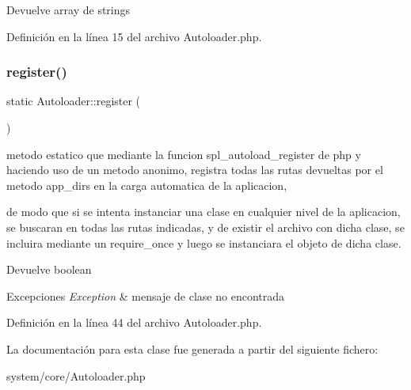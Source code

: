 \begin{DoxyReturn}{Devuelve}
array de strings 
\end{DoxyReturn}


Definición en la línea 15 del archivo Autoloader.\+php.

\mbox{\label{class_autoloader_a818817cb215d74d3c65e4855898b8902}} 
\subsubsection{\texorpdfstring{register()}{register()}}
{\footnotesize\ttfamily static Autoloader\+::register (\begin{DoxyParamCaption}{ }\end{DoxyParamCaption})\hspace{0.3cm}{\ttfamily [static]}}

metodo estatico que mediante la funcion spl\+\_\+autoload\+\_\+register de php y haciendo uso de un metodo anonimo, registra todas las rutas devueltas por el metodo app\+\_\+dirs en la carga automatica de la aplicacion,

de modo que si se intenta instanciar una clase en cualquier nivel de la aplicacion, se buscaran en todas las rutas indicadas, y de existir el archivo con dicha clase, se incluira mediante un require\+\_\+once y luego se instanciara el objeto de dicha clase.

\begin{DoxyReturn}{Devuelve}
boolean 
\end{DoxyReturn}

\begin{DoxyExceptions}{Excepciones}
{\em Exception} & mensaje de clase no encontrada \\
\hline
\end{DoxyExceptions}


Definición en la línea 44 del archivo Autoloader.\+php.



La documentación para esta clase fue generada a partir del siguiente fichero\+:\begin{DoxyCompactItemize}
\item 
system/core/Autoloader.\+php\end{DoxyCompactItemize}
